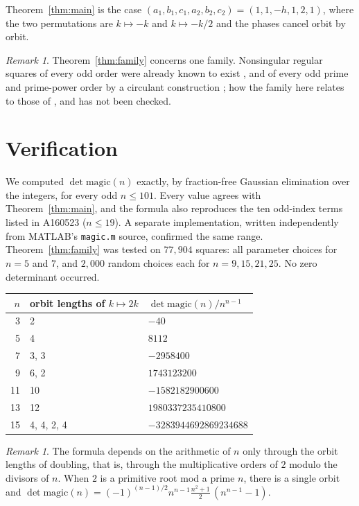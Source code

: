 \documentclass[11pt]{amsart}
\theoremstyle{remark}
\newtheorem{remark}[theorem]{Remark}
\begin{document}
Theorem~\ref{thm:main} is the case $(a_1,b_1,c_1,a_2,b_2,c_2)=(1,1,-h,1,2,1)$, where the two permutations are
$k\mapsto-k$ and $k\mapsto-k/2$ and the phases cancel orbit by orbit.

\begin{remark}
Theorem~\ref{thm:family} concerns one family. Nonsingular regular squares of every odd order were already known to
exist \cite{jr}, and of every odd prime and prime-power order by a circulant construction \cite{llnww}; how the family
here relates to those of \cite{llnww}, \cite{cmnw} and \cite{lgz} has not been checked.
\end{remark}

\section{Verification}

We computed $\det\mathrm{magic}(n)$ exactly, by fraction-free Gaussian elimination over the integers, for every odd
$n\le101$. Every value agrees with Theorem~\ref{thm:main}, and the formula also reproduces the ten odd-index terms
listed in A160523 ($n\le19$). A separate implementation, written independently from MATLAB's \texttt{magic.m} source,
confirmed the same range. Theorem~\ref{thm:family} was tested on $77{,}904$ squares: all parameter choices for
$n=5$ and $7$, and $2{,}000$ random choices each for $n=9,15,21,25$. No zero determinant occurred.

\begin{table}[h]
\centering
\begin{tabular}{rll}
\toprule
$n$ & orbit lengths of $k\mapsto2k$ & $\det\mathrm{magic}(n)/n^{n-1}$ \\
\midrule
3 & 2 & $-40$ \\
5 & 4 & $8112$ \\
7 & 3, 3 & $-2958400$ \\
9 & 6, 2 & $1743123200$ \\
11 & 10 & $-1582182900600$ \\
13 & 12 & $1980337235410800$ \\
15 & 4, 4, 2, 4 & $-3283944692869234688$ \\
\bottomrule
\end{tabular}
\end{table}

\begin{remark}
The formula depends on the arithmetic of $n$ only through the orbit lengths of doubling, that is, through the
multiplicative orders of $2$ modulo the divisors of $n$. When $2$ is a primitive root mod a prime $n$, there is a
single orbit and $\det\mathrm{magic}(n)=(-1)^{(n-1)/2}n^{n-1}\frac{n^2+1}{2}\,(n^{n-1}-1)$.
\end{remark}
\end{document}
